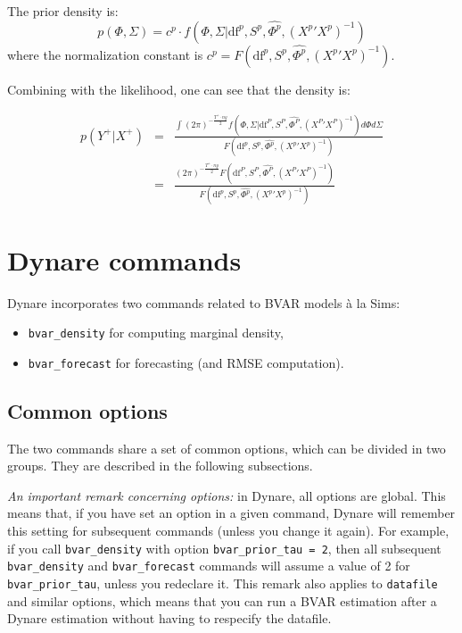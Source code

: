 \documentclass[10pt,a4paper]{article}
\newcommand{\df}{\text{df}}
\begin{document}
The prior density is:
$$p(\Phi, \Sigma) = c^p \cdot f(\Phi,\Sigma | \df^p,S^p,\hat{\Phi^p},({X^p}'X^p)^{-1})$$
where the normalization constant is $c^p = F(\df^p,S^p,\hat{\Phi^p},({X^p}'X^p)^{-1})$.



Combining with the likelihood, one can see that the density is:

\begin{eqnarray*}
p(Y^+ | X^+) & = & \frac{\int (2\pi)^{-\frac{T^+\cdot ny}{2}} f(\Phi,\Sigma | \df^P,S^P,\hat{\Phi^P},({X^P}'X^P)^{-1})d\Phi d\Sigma}{F(\df^p,S^p,\hat{\Phi^p},({X^p}'X^p)^{-1})} \\
& = & \frac{(2\pi)^{-\frac{T^+\cdot ny}{2}} F(\df^P,S^P,\hat{\Phi^P},({X^P}'X^P)^{-1})}{F(\df^p,S^p,\hat{\Phi^p},({X^p}'X^p)^{-1})}
\end{eqnarray*}

\section{Dynare commands}
\label{dynare-commands}

Dynare incorporates two commands related to BVAR models \`a la Sims:
\begin{itemize}
\item \texttt{bvar\_density} for computing marginal density,
\item \texttt{bvar\_forecast} for forecasting (and RMSE computation).
\end{itemize}

\subsection{Common options}

The two commands share a set of common options, which can be divided in two groups. They are described in the following subsections.

\emph{An important remark concerning options:} in Dynare, all options are global. This means that, if you have set an option in a given command, Dynare will remember this setting for subsequent commands (unless you change it again). For example, if you call \texttt{bvar\_density} with option \texttt{bvar\_prior\_tau = 2}, then all subsequent \texttt{bvar\_density} and \texttt{bvar\_forecast} commands will assume a value of 2 for \texttt{bvar\_prior\_tau}, unless you redeclare it. This remark also applies to \texttt{datafile} and similar options, which means that you can run a BVAR estimation after a Dynare estimation without having to respecify the datafile.
\end{document}
